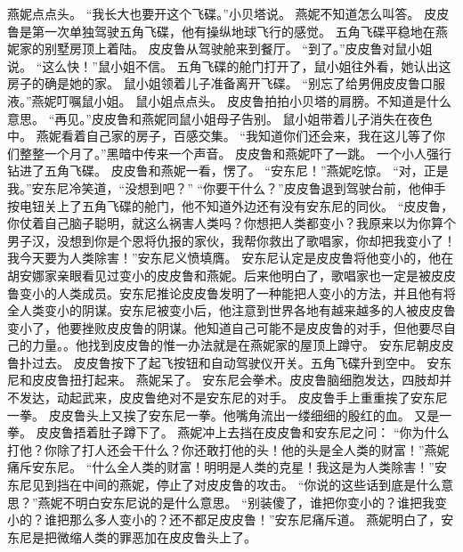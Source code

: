 \documentclass[a4paper,12pt,UTF8,twoside]{ctexbook}
\begin{document}
        燕妮点点头。  
        “我长大也要开这个飞碟。”小贝塔说。  
        燕妮不知道怎么叫答。  
        皮皮鲁是第一次单独驾驶五角飞碟，他有操纵地球飞行的感觉。  
        五角飞碟平稳地在燕妮家的别墅房顶上着陆。  
        皮皮鲁从驾驶舱来到餐厅。  
        “到了。”皮皮鲁对鼠小姐说。  
        “这么快！”鼠小姐不信。  
        五角飞碟的舱门打开了，鼠小姐往外看，她认出这房子的确是她的家。  
        鼠小姐领着儿子准备离开飞碟。  
        “别忘了给男佣皮皮鲁口服液。”燕妮叮嘱鼠小姐。  
        鼠小姐点点头。  
        皮皮鲁拍拍小贝塔的肩膀。不知道是什么意思。  
        “再见。”皮皮鲁和燕妮同鼠小姐母子告别。  
        鼠小姐带着儿子消失在夜色中。  
        燕妮看着自己家的房子，百感交集。  
        “我知道你们还会来，我在这儿等了你们整整一个月了。”黑暗中传来一个声音。  
        皮皮鲁和燕妮吓了一跳。  
        一个小人强行钻进了五角飞碟。  
        皮皮鲁和燕妮一看，愣了。        
        “安东尼！”燕妮吃惊。  
        “对，正是我。”安东尼冷笑道，“没想到吧？”  
        “你要干什么？”皮皮鲁退到驾驶台前，他伸手按电钮关上了五角飞碟的舱门，他不知道外边还有没有安东尼的同伙。  
        “皮皮鲁，你仗着自己脑子聪明，就这么祸害人类吗？你想把人类都变小？我原来以为你算个男子汉，没想到你是个恩将仇报的家伙，我帮你救出了歌唱家，你却把我变小了！我今天要为人类除害！”安东尼义愤填膺。  
        安东尼认定是皮皮鲁将他变小的，他在胡安娜家亲眼看见过变小的皮皮鲁和燕妮。后来他明白了，歌唱家也一定是被皮皮鲁变小的人类成员。安东尼推论皮皮鲁发明了一种能把人变小的方法，并且他有将全人类变小的阴谋。安东尼被变小后，他注意到世界各地有越来越多的人被皮皮鲁变小了，他要挫败皮皮鲁的阴谋。他知道自己可能不是皮皮鲁的对手，但他要尽自己的力量。。他找到皮皮鲁的惟一办法就是在燕妮家的屋顶上蹲守。  
        安东尼朝皮皮鲁扑过去。  
        皮皮鲁按下了起飞按钮和自动驾驶仪开关。五角飞碟升到空中。  
        安东尼和皮皮鲁扭打起来。  
        燕妮呆了。        
        安东尼会拳术。皮皮鲁脑细胞发达，四肢却并不发达，动起武来，皮皮鲁绝对不是安东尼的对手。  
        皮皮鲁手上重重挨了安东尼一拳。  
        皮皮鲁头上又挨了安东尼一拳。他嘴角流出一缕细细的殷红的血。  
        又是一拳。  
        皮皮鲁捂着肚子蹲下了。  
        燕妮冲上去挡在皮皮鲁和安东尼之问：  
        “你为什么打他？你除了打人还会干什么？你还敢打他的头！他的头是全人类的财富！”燕妮痛斥安东尼。  
        “什么全人类的财富！明明是人类的克星！我这是为人类除害！”安东尼见到挡在中间的燕妮，停止了对皮皮鲁的攻击。  
        “你说的这些话到底是什么意思？”燕妮不明白安东尼说的是什么意思。  
        “别装傻了，谁把你变小的？谁把我变小的？谁把那么多人变小的？还不都足皮皮鲁！”安东尼痛斥道。  
        燕妮明白了，安东尼是把微缩人类的罪恶加在皮皮鲁头上了。  
\end{document}
